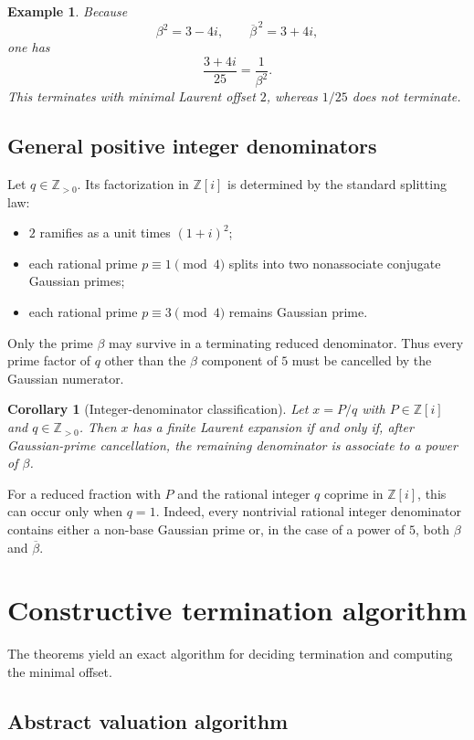 \documentclass[11pt]{article}
\newtheorem{corollary}[theorem]{Corollary}
\newtheorem{example}[theorem]{Example}
\theoremstyle{definition}
\newcommand{\Zi}{\mathbb{Z}[i]}
\begin{document}
\begin{example}
Because
\[
\beta^2=3-4i,
\qquad
\overline\beta^{\,2}=3+4i,
\]
one has
\[
\frac{3+4i}{25}=\frac1{\beta^2}.
\]
This terminates with minimal Laurent offset $2$, whereas $1/25$ does not terminate.
\end{example}

\subsection{General positive integer denominators}

Let $q\in\mathbb Z_{>0}$.  Its factorization in $\Zi$ is determined by the standard splitting law:
\begin{itemize}
\item $2$ ramifies as a unit times $(1+i)^2$;
\item each rational prime $p\equiv1\pmod4$ splits into two nonassociate conjugate Gaussian primes;
\item each rational prime $p\equiv3\pmod4$ remains Gaussian prime.
\end{itemize}
Only the prime $\beta$ may survive in a terminating reduced denominator.  Thus every prime factor of $q$ other than the $\beta$ component of $5$ must be cancelled by the Gaussian numerator.

\begin{corollary}[Integer-denominator classification]
Let $x=P/q$ with $P\in\Zi$ and $q\in\mathbb Z_{>0}$.  Then $x$ has a finite Laurent expansion if and only if, after Gaussian-prime cancellation, the remaining denominator is associate to a power of $\beta$.
\end{corollary}

For a reduced fraction with $P$ and the rational integer $q$ coprime in $\Zi$, this can occur only when $q=1$.  Indeed, every nontrivial rational integer denominator contains either a non-base Gaussian prime or, in the case of a power of $5$, both $\beta$ and $\overline\beta$.

\section{Constructive termination algorithm}

The theorems yield an exact algorithm for deciding termination and computing the minimal offset.

\subsection{Abstract valuation algorithm}
\end{document}
